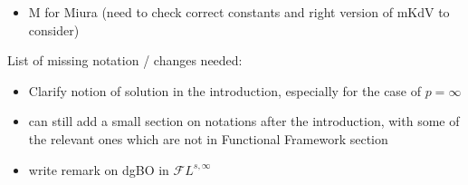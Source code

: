 \documentclass[%
11pt,  reqno]{amsart}
\newcommand{\5}{\textup{V}}
\newcommand{\FL}{\mathcal{F} L}
\theoremstyle{remark}
\newcommand{\R}{\mathbb{R}}
\newcommand{\T}{\mathbb{T}}
\numberwithin{equation}{section}
\numberwithin{theorem}{section}
\newcommand{\MM}{\mathrm{M}}
\begin{document}
\begin{itemize}
\item $\MM$ for Miura (need to check correct constants and right version of mKdV to consider)

    
\end{itemize}
    
    List of missing notation / changes needed:
    \begin{itemize}

    \item Clarify notion of solution in the introduction, especially for the case of $p=\infty$

    







\item can still add a small section on notations after the introduction, with some of the relevant ones which are not in Functional Framework section


 \item write remark on dgBO in $\FL^{s, \infty}$



    \end{itemize}


    
    \newpage
	
	
	
	
		
		
		
		
		
		
		
		
		
		
		
		
\end{document}
